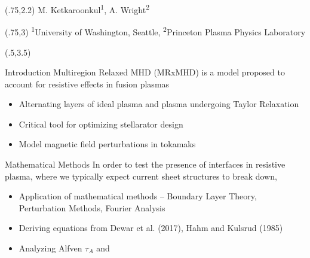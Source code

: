 \documentclass{beamer}
\begin{document}
\begin{frame}[t]
\newcommand{\psih}{\hat{\psi}}
\newcommand{\xbdy}{x_{bdy}(y)}
\newcommand{\besj}[2]{J_{#1}\lr{#2}}
\newcommand{\besi}[2]{I_{#1}\lr{#2}}

\newcommand{\reals}{\mathbb{R}}
\newcommand{\complexes}{\mathbb{C}}
\newcommand{\muo}{\mu_{0}}


\begin{textblock}{28}(.75,2.2)
{\huge
    M. Ketkaroonkul\textsuperscript{1},
    A. Wright\textsuperscript{2}
}
\end{textblock}
\begin{textblock}{24}(.75,3)
{\large
    \textsuperscript{1}University of Washington, Seattle,
    \textsuperscript{2}Princeton Plasma Physics Laboratory
}
\end{textblock}




\begin{textblock}{15}(.5,3.5)
{\Large
\begin{block}{Introduction}
Multiregion Relaxed MHD (MRxMHD) is a model proposed to account for resistive effects in fusion plasmas
\begin{itemize}
    \item Alternating layers of ideal plasma and plasma undergoing Taylor Relaxation 
    \item Critical tool for optimizing stellarator design
    \item Model magnetic field perturbations in tokamaks
\end{itemize}
\end{block}


\begin{block}{Mathematical Methods}
In order to test the presence of interfaces in resistive plasma, where we typically expect current sheet structures to break down,
\begin{itemize}
    \item Application of mathematical methods -- Boundary Layer Theory, Perturbation Methods, Fourier Analysis
    \item Deriving equations from Dewar et al. (2017), Hahm and Kulsrud (1985)
    \item Analyzing Alfven $\tau_A$ and 
\end{itemize}
\end{block}



}
\end{textblock}
\end{frame}
\end{document}
